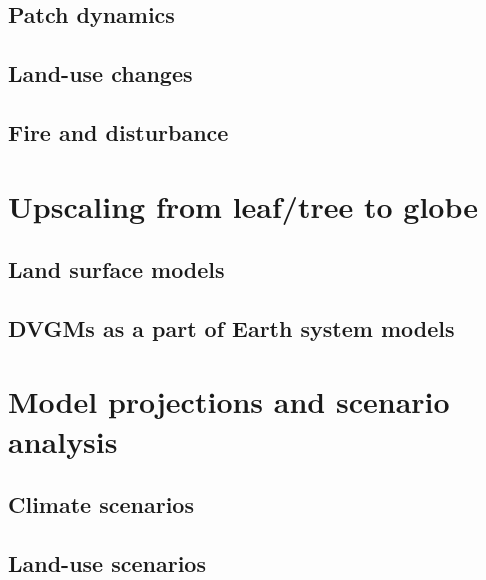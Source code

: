 \documentclass[]{book}
\begin{document}

\section{Patch dynamics}\label{patch-dynamics}

\section{Land-use changes}\label{land-use-changes}

\section{Fire and disturbance}\label{fire-and-disturbance}

\chapter{Upscaling from leaf/tree to
globe}\label{upscaling-from-leaftree-to-globe}


\section{Land surface models}\label{land-surface-models}

\section{DVGMs as a part of Earth system
models}\label{dvgms-as-a-part-of-earth-system-models}

\chapter{Model projections and scenario
analysis}\label{model-projections-and-scenario-analysis}


\section{Climate scenarios}\label{climate-scenarios}

\section{Land-use scenarios}\label{land-use-scenarios}
\end{document}
